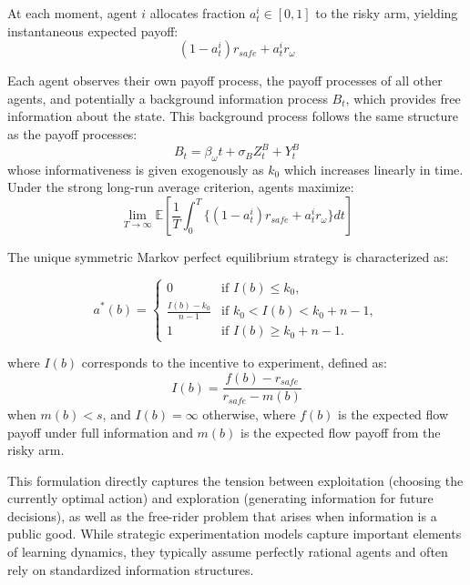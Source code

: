 \documentclass[a4paper,12pt]{report}
\begin{document}
At each moment, agent $i$ allocates fraction $a^i_{t} \in [0,1]$ to the risky arm, yielding instantaneous expected payoff:
\begin{equation*}
    (1-a^i_{t})r_\textit{safe} + a^i_{t}r_{\omega}
\end{equation*}

Each agent observes their own payoff process, the payoff processes of all other agents, and potentially a background information process $B_t$, which provides free information about the state. This background process follows the same structure as the payoff processes:
\begin{equation*}
    B_t = \beta_{\omega} t + \sigma_B Z^B_t + Y^B_t
\end{equation*}
whose informativeness is given exogenously as $k_0$ which increases linearly in time. Under the strong long-run average criterion, agents maximize:
\begin{equation}
    \lim_{T \to \infty} \mathbb{E}\left[\frac{1}{T}\int_0^{T}\{(1-a^i_{t})r_\textit{safe} + a^i_{t}r_{\omega}\}dt\right]
\end{equation}

The unique symmetric Markov perfect equilibrium strategy is characterized as:

\begin{equation}
    a^*(b) =
    \begin{cases}
        0                    & \text{if } I(b) \leq k_0,            \\
        \frac{I(b)-k_0}{n-1} & \text{if } k_0 < I(b) < k_0 + n - 1, \\
        1                    & \text{if } I(b) \geq k_0 + n - 1.
    \end{cases}
\end{equation}

where $I(b)$ corresponds to the incentive to experiment, defined as:
\begin{equation*}
    I(b) = \frac{f(b) - r_\textit{safe}}{r_\textit{safe} - m(b)}
\end{equation*}
when $m(b) < s$, and $I(b) = \infty$ otherwise, where $f(b)$ is the expected flow payoff under full information and $m(b)$ is the expected flow payoff from the risky arm.

This formulation directly captures the tension between exploitation (choosing the currently optimal action) and exploration (generating information for future decisions), as well as the free-rider problem that arises when information is a public good. While strategic experimentation models capture important elements of learning dynamics, they typically assume perfectly rational agents and often rely on standardized information structures.
\end{document}

